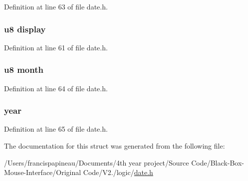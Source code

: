 \-Definition at line 63 of file date.\-h.

\hypertarget{structdate_a38f8f410104c7551db27a14196c8e15c}{
\subsubsection[{display}]{\setlength{\rightskip}{0pt plus 5cm}u8 {\bf display}}}\label{structdate_a38f8f410104c7551db27a14196c8e15c}


\-Definition at line 61 of file date.\-h.

\hypertarget{structdate_ad5f8cd6773aef677b920ae4e4265bb10}{
\subsubsection[{month}]{\setlength{\rightskip}{0pt plus 5cm}u8 {\bf month}}}\label{structdate_ad5f8cd6773aef677b920ae4e4265bb10}


\-Definition at line 64 of file date.\-h.

\hypertarget{structdate_a5f976764bc633de731704ebdaf334b0b}{
\subsubsection[{year}]{ {\bf year}}}\label{structdate_a5f976764bc633de731704ebdaf334b0b}


\-Definition at line 65 of file date.\-h.



\-The documentation for this struct was generated from the following file\-:\begin{DoxyCompactItemize}
\item 
/\-Users/francispapineau/\-Documents/4th year project/\-Source Code/\-Black-\/\-Box-\/\-Mouse-\/\-Interface/\-Original Code/\-V2./logic/\hyperlink{date_8h}{date.\-h}\end{DoxyCompactItemize}
